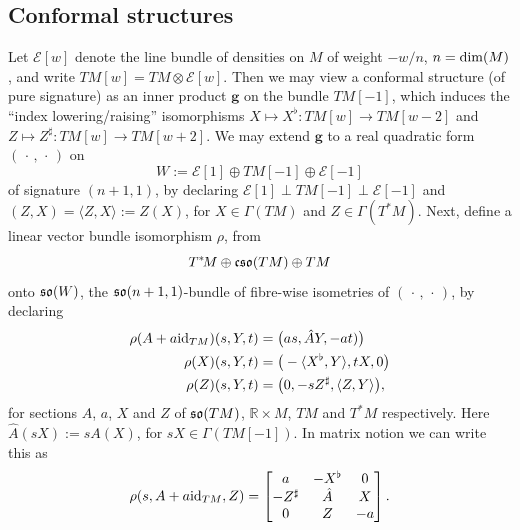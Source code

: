 \documentclass[leqno,12pt]{amsart} %
\newcommand{\confmetric}{{\mathrm{\mathbf{g}}}}
\begin{document}
\subsection{Conformal structures}\label{conformalaslevi} Let ${\mathcal E} [w]$ denote the line bundle of
densities on $M$ of weight $-w/n$, $n =\operatorname{dim}(M)$, and write
$TM[w]=TM \otimes {\mathcal E}[w]$. Then we may view a conformal structure (of pure
signature) as an inner product $\confmetric$ on the bundle $TM[-1]$, which induces the
``index lowering/raising'' isomorphisms
$X \mapsto X^\flat \colon TM[w] \rightarrow TM[w-2]$ and
$Z \mapsto Z^\sharp \colon TM[w] \rightarrow TM[w + 2]$. We may extend $\confmetric$ to a
real quadratic form $(\,\cdot\,,\,\cdot\,)$ on
  $$W := {\mathcal E}[1] \oplus TM[-1] \oplus {\mathcal E}[-1]$$ of signature
  $(n + 1, 1)$, by declaring ${\mathcal E}[1] \perp TM[-1] \perp {\mathcal E}[-1] $ and
  $(Z, X) = \langle Z, X\rangle := Z(X)$, for $X \in \Gamma(TM)$ and
  $Z \in \Gamma(T^*\!M)$.  Next, define a linear vector bundle isomorphism $\rho$, from
  \begin{equation}
    \label{labconformal}
     T^*\!M \oplus \mathfrak{cso}(TM) \oplus TM
  \end{equation}
  onto $\mathfrak{so}(W)$, the
  $\mathfrak{so}(n + 1, 1)$-bundle of fibre-wise isometries of $(\,\cdot\,,\,\cdot\,)$, by declaring
  \begin{align*}
    \rho(A + a\mathrm{id}_{TM})(s, Y, t) &= \big(as, \hat AY, -at)\big)\\
    \rho(X)(s, Y, t) & = \big(-\langle X^\flat, Y\rangle, tX, 0\big)\\
    \rho(Z)(s, Y, t) &= \big(0, -sZ^\sharp, \langle Z, Y\rangle\big),
  \end{align*}
  for sections $A$, $a$, $X$ and $Z$ of $\mathfrak{so}(TM)$, ${\mathbb R} \times M$, $TM$ and
  $T^*\!M$ respectively. Here $\hat A(sX) := sA(X)$, for $sX \in \Gamma(TM[-1])$.  In
  matrix notion we can write this as
  \begin{equation*}
    \rho(s, A + a\mathrm{id}_{TM}, Z) =
    \begin{bmatrix}
      a & -X^\flat & 0 \\ -Z^\sharp & \hat A & X\\ 0 & Z & -a
    \end{bmatrix}.
  \end{equation*}
\end{document}
